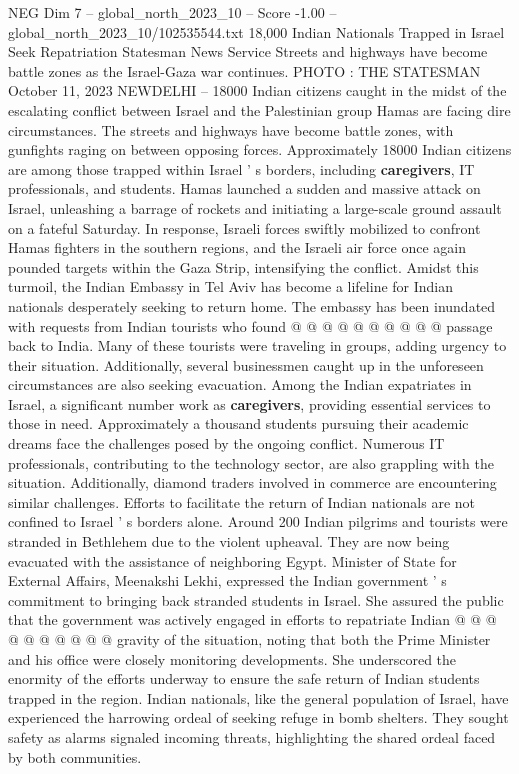\begin{textsample}{NEG Dim 7 – global\_north\_2023\_10 – Score -1.00 – global\_north\_2023\_10/102535544.txt}  \label{ex:f7_neg_204}
18,000 Indian Nationals Trapped in Israel Seek Repatriation Statesman News Service Streets and highways have become battle zones as the Israel-Gaza war continues.
PHOTO : THE STATESMAN October 11, 2023 NEWDELHI -- 18000 Indian citizens caught in the midst of the escalating conflict between Israel and the Palestinian group Hamas are facing dire circumstances.
The streets and highways have become battle zones, with gunfights raging on between opposing forces.
Approximately 18000 Indian citizens are among those trapped within Israel ' s borders, including \textbf{caregivers}, IT professionals, and students.
Hamas launched a sudden and massive attack on Israel, unleashing a barrage of rockets and initiating a large-scale ground assault on a fateful Saturday.
In response, Israeli forces swiftly mobilized to confront Hamas fighters in the southern regions, and the Israeli air force once again pounded targets within the Gaza Strip, intensifying the conflict.
Amidst this turmoil, the Indian Embassy in Tel Aviv has become a lifeline for Indian nationals desperately seeking to return home.
The embassy has been inundated with requests from Indian tourists who found @ @ @ @ @ @ @ @ @ @ passage back to India.
Many of these tourists were traveling in groups, adding urgency to their situation.
Additionally, several businessmen caught up in the unforeseen circumstances are also seeking evacuation.
Among the Indian expatriates in Israel, a significant number work as \textbf{caregivers}, providing essential services to those in need.
Approximately a thousand students pursuing their academic dreams face the challenges posed by the ongoing conflict.
Numerous IT professionals, contributing to the technology sector, are also grappling with the situation.
Additionally, diamond traders involved in commerce are encountering similar challenges.
Efforts to facilitate the return of Indian nationals are not confined to Israel ' s borders alone.
Around 200 Indian pilgrims and tourists were stranded in Bethlehem due to the violent upheaval.
They are now being evacuated with the assistance of neighboring Egypt.
Minister of State for External Affairs, Meenakshi Lekhi, expressed the Indian government ' s commitment to bringing back stranded students in Israel.
She assured the public that the government was actively engaged in efforts to repatriate Indian @ @ @ @ @ @ @ @ @ @ gravity of the situation, noting that both the Prime Minister and his office were closely monitoring developments.
She underscored the enormity of the efforts underway to ensure the safe return of Indian students trapped in the region.
Indian nationals, like the general population of Israel, have experienced the harrowing ordeal of seeking refuge in bomb shelters.
They sought safety as alarms signaled incoming threats, highlighting the shared ordeal faced by both communities.

\end{textsample}
